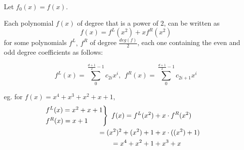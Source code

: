 \documentclass{article}
\theoremstyle{definition}
\begin{document}
Let $f_0(x)=f(x)$.

Each polynomial $f(x)$ of degree that is a power of $2$, can be written as
$$f(x) = f^L(x^2) + x f^R(x^2)$$
for some polynomials $f^L,~f^R$ of degree $\frac{deg(f)}{2}$, each one containing the even and odd degree coefficients as follows:


$$f^L(x)= \sum_0^{\frac{d+1}{2}-1} c_{2i} x^i ,~~ f^R(x)= \sum_0^{\frac{d+1}{2}-1} c_{2i+1} x^i$$

eg. for $f(x)=x^4+x^3+x^2+x+1$,
\begin{align*}
	\begin{rcases}
	f^L(x)=x^2+x+1\\
	f^R(x)=x+1
	\end{rcases}
	~f(x) = f^L(x^2) &+ x \cdot f^R(x^2)\\
	= (x^2)^2 + (x^2) + 1 &+ x \cdot ((x^2) + 1)\\
	= x^4 + x^2 + 1 &+ x^3 + x
\end{align*}

% 
% 
\end{document}
